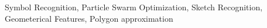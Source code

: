 \documentclass[preprint,10pt,5p,twocolumn]{elsarticle}
\begin{document}
\begin{frontmatter}
\begin{abstract}
\end{abstract}

\begin{keyword}
Symbol Recognition, Particle Swarm Optimization, Sketch Recognition, Geometerical Features, Polygon approximation


\end{keyword}

\end{frontmatter}



\end{document}
